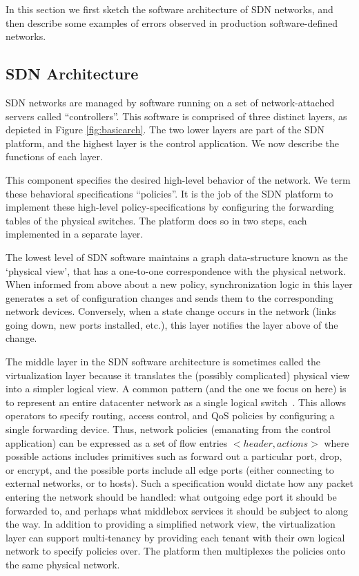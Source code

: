 In this section we first sketch the software architecture of SDN networks, and then describe some examples
of errors observed in production software-defined networks.

\subsection{SDN Architecture}

SDN networks are managed by software running on a set of network-attached servers called ``controllers''. This software is comprised of three distinct layers, as
depicted in Figure \ref{fig:basicarch}. The two lower layers are part of the SDN platform, and the highest layer is the control application. We now describe the functions of each layer.

 This component specifies the desired
high-level behavior of the network. We term these behavioral specifications ``policies''. It is the job of the SDN platform to implement these high-level policy-specifications by configuring the forwarding tables of the physical switches. The platform does so in two steps, each implemented in a separate layer.

 The lowest level of SDN software maintains a graph data-structure known as
the `physical view', that has a one-to-one correspondence with the physical
network. When informed from above about a new policy,
synchronization logic in this layer generates a set of configuration changes and sends them to the
corresponding network devices. Conversely, when a state change
occurs in the network (links going down, new ports installed, etc.), this layer notifies the layer above of the change.

 The middle layer in the SDN software architecture is sometimes called the virtualization layer because it translates the (possibly complicated) physical view into a simpler logical view. A common pattern (and the one we focus on here) is to represent an entire
datacenter network as a single logical
switch~\cite{Casado:2010:VNF:1921151.1921162}. This allows operators
to specify routing, access control, and QoS policies by configuring a single forwarding
device. Thus, network policies (emanating from the control application) can be
expressed as a set of flow entries $<header, actions>$ where possible actions
includes primitives such as forward out a particular port, drop, or encrypt,
and the possible ports include all edge ports (either connecting to external
networks, or to hosts). Such a specification would dictate how any packet
entering the network should be handled: \ie{} what outgoing edge port it should be forwarded to, and perhaps what middlebox services it should be subject to along the way.
In addition to providing a simplified network view, the virtualization layer
can support multi-tenancy by providing each tenant with their own logical
network to specify policies over. The platform then multiplexes the policies onto the same physical network.

